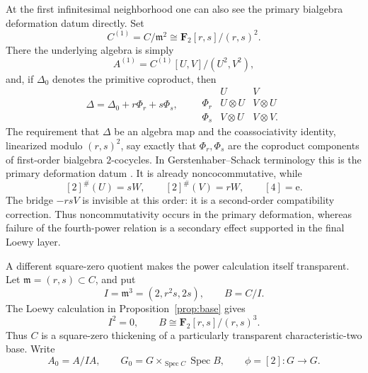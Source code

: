 \documentclass[11pt]{amsart}
\theoremstyle{definition}
\theoremstyle{remark}
\newcommand{\F}{\mathbf F}
\newcommand{\Spec}{\operatorname{Spec}}
\newcommand{\m}{\mathfrak m}
\newcommand{\ot}{\otimes}
\newcommand{\unit}{\mathrm e}
\begin{document}
At the first infinitesimal neighborhood one can also see the primary
bialgebra deformation datum directly.  Set
\[
 C^{(1)}=C/\m^2\cong\F_2[r,s]/(r,s)^2.
\]
There the underlying algebra is simply
\[
 A^{(1)}=C^{(1)}[U,V]/(U^2,V^2),
\]
and, if \(\Delta_0\) denotes the primitive coproduct, then
\begin{equation}\label{eq:first-order-coproduct}
 \Delta=\Delta_0+r\Phi_r+s\Phi_s,
 \qquad
 \begin{array}{c|cc}
  &U&V\\ \hline
  \Phi_r&U\ot U&V\ot U\\
  \Phi_s&V\ot U&V\ot V.
 \end{array}
\end{equation}
The requirement that \(\Delta\) be an algebra map and the coassociativity
identity, linearized modulo \((r,s)^2\), say exactly that
\(\Phi_r,\Phi_s\) are the coproduct components of first-order bialgebra
\(2\)-cocycles.  In Gerstenhaber--Schack terminology this is the primary
deformation datum \cite{GerstenhaberSchack}.  It is already
noncocommutative, while
\begin{equation}\label{eq:first-order-doubling}
 [2]^\#(U)=sW,
 \qquad
 [2]^\#(V)=rW,
 \qquad
 [4]=\unit.
\end{equation}
The bridge \(-rsV\) is invisible at this order: it is a second-order
compatibility correction.  Thus noncommutativity occurs in the primary
deformation, whereas failure of the fourth-power relation is a secondary
effect supported in the final Loewy layer.

A different square-zero quotient makes the power calculation itself
transparent.  Let \(\m=(r,s)\subset C\), and put
\begin{equation}\label{eq:square-zero-extension}
 I=\m^3=(2,r^2s,2s),
 \qquad
 B=C/I.
\end{equation}
The Loewy calculation in Proposition~\ref{prop:base} gives
\begin{equation}\label{eq:easy-base}
 I^2=0,
 \qquad
 B\cong \F_2[r,s]/(r,s)^3.
\end{equation}
Thus \(C\) is a square-zero thickening of a particularly transparent
characteristic-two base.  Write
\[
 A_0=A/IA,
 \qquad
 G_0=G\mathbin{\times}_{\Spec C}\Spec B,
 \qquad
 \phi=[2]\colon G\longrightarrow G.
\]
\end{document}
